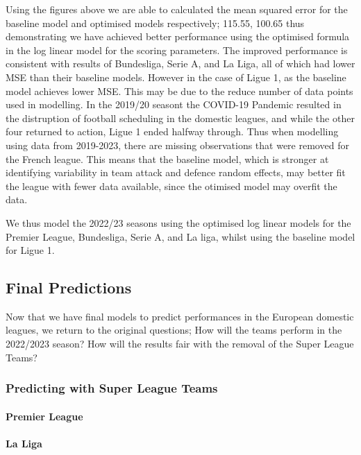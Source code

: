\documentclass[
]{article}
\begin{document}
Using the figures above we are able to calculated the mean squared error
for the baseline model and optimised models respectively; 115.55, 100.65
thus demonstrating we have achieved better performance using the
optimised formula in the log linear model for the scoring parameters.
The improved performance is consistent with results of Bundesliga, Serie
A, and La Liga, all of which had lower MSE than their baseline models.
However in the case of Ligue 1, as the baseline model achieves lower
MSE. This may be due to the reduce number of data points used in
modelling. In the 2019/20 seasont the COVID-19 Pandemic resulted in the
distruption of football scheduling in the domestic leagues, and while
the other four returned to action, Ligue 1 ended halfway through. Thus
when modelling using data from 2019-2023, there are missing observations
that were removed for the French league. This means that the baseline
model, which is stronger at identifying variability in team attack and
defence random effects, may better fit the league with fewer data
available, since the otimised model may overfit the data.

We thus model the 2022/23 seasons using the optimised log linear models
for the Premier League, Bundesliga, Serie A, and La liga, whilst using
the baseline model for Ligue 1.

\hypertarget{final-predictions}{%
\subsection{Final Predictions}\label{final-predictions}}

Now that we have final models to predict performances in the European
domestic leagues, we return to the original questions; How will the
teams perform in the 2022/2023 season? How will the results fair with
the removal of the Super League Teams?

\hypertarget{predicting-with-super-league-teams}{%
\subsubsection{Predicting with Super League
Teams}\label{predicting-with-super-league-teams}}

\hypertarget{premier-league-1}{%
\paragraph{Premier League}\label{premier-league-1}}

\hypertarget{la-liga-1}{%
\paragraph{La Liga}\label{la-liga-1}}
\end{document}
